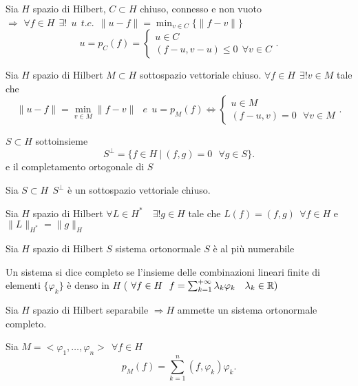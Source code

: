 \documentclass[12px]{article}
\begin{document}
	\begin{teo}
		Sia $H$ spazio di Hilbert,  $C\subset H$ chiuso, connesso e non vuoto\\
		$ \Rightarrow  $ $\forall f\in H\ \ \exists !\ \ u  \ \ t.c.\ \ \|u-f\| = \min_{v\in C} \{\|f-v\|\}$ \[
		u = p_C(f) = \begin{cases}
			u\in C\\
			(f-u,  v-u)\leq 0\ \ \forall v\in C
		\end{cases}
		.\] 
	\end{teo}
	\begin{coro}
		Sia $H$ spazio di Hilbert $M\subset H$ sottospazio vettoriale chiuso.  $\forall f\in H\ \ \exists! v\in M$ tale che 
		 \[
			 \|u-f\| = \min_{v\in M}\|f-v\|\ \ \ e \ \ u = p_M(f) \Leftrightarrow \begin{cases}
			 	u \in M\\
				(f-u, v) = 0\ \ \ \forall v \in M
			 \end{cases}
		.\] 
	\end{coro}
	\begin{defi}
		$S\subset H$ sottoinsieme
		 \[
			 S^\perp = \{f\in H\ | \ (f,g) = 0\ \ \ \forall g\in S\}
		.\]  e il completamento ortogonale di $S$
	\end{defi}
	\begin{prop}
		Sia $S\subset H\ \ S^\perp$ è un sottospazio vettoriale chiuso.
	\end{prop}
	\begin{teo}[Ritz]
		Sia $H$ spazio di Hilbert $\forall L\in H^*$\ \  $\exists ! g\in H$ tale che  $L(f) = (f,g)\ \ \forall f\in H$ e $\|L\|_{H^*} = \|g\|_H$
	\end{teo}
	\begin{prop}
		Sia $H$ spazio di Hilbert  $S$ sistema ortonormale $S$ è al più numerabile
	\end{prop}
	\begin{defi}
		Un sistema si dice completo se l'insieme delle combinazioni lineari finite di elementi $\{ \varphi_k\}$ è denso in $H$ ( $\forall f\in H\ \ f = \sum^{+\infty}_{k=1} \lambda_k \varphi_k \ \ \ \lambda_k\in \mathbb{R})$
	\end{defi}
	\begin{teo}
		Sia $H$ spazio di Hilbert separabile $ \Rightarrow  H$ ammette un sistema ortonormale completo.
	\end{teo}
	\begin{prop}
		Sia $M = < \varphi_1,\ldots, \varphi_n > \ \ \forall f\in H$\\
		\[
		p_M(f) = \sum^{n}_{k=1} (f, \varphi_k) \varphi_k
		.\]
	\end{prop}
\end{document}
